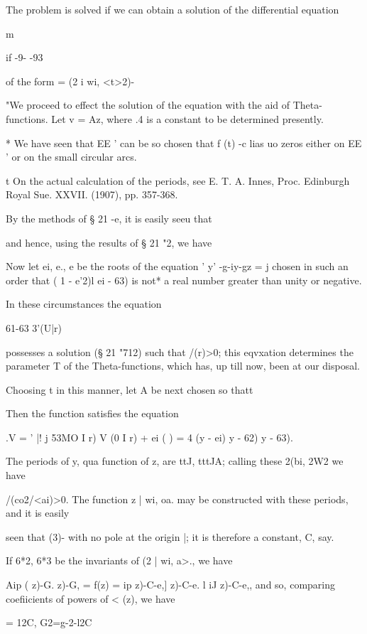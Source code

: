 The problem is solved if we can obtain a solution of the differential
equation

m

   if -9- -93

of the form = (2 i wi, <t>2)-

"We proceed to effect the solution of the equation with the aid of
Theta-functions. Let v = Az, where .4 is a constant to be determined
presently.

* We have seen that EE ' can be so chosen that f (t) -c lias uo zeros
either on EE ' or on the small circular arcs.

t On the actual calculation of the periods, see E. T. A. Innes, Proc.
Edinburgh Royal Sue. XXVII. (1907), pp. 357-368.

%
%

By the methods of § 21 -e, it is easily seeu that

and hence, using the results of § 21 "2, we have

Now let ei, e., e be the roots of the equation ' y' -g-iy-gz = j
chosen in such an order that ( 1 - e'2)l ei - 63) is not* a real
number greater than unity or negative.

In these circumstances the equation

61-63 3'(U|r)

possesses a solution (§ 21 "712) such that /(r)>0; this eqvxation
determines the parameter T of the Theta-functions, which has, up till
now, been at our disposal.

Choosing t in this manner, let A be next chosen so thatt

Then the function satisfies the equation

.V = ' |! j 53MO I r) V (0 I r) + ei ( ) = 4 (y - ei) y - 62) y - 63).

The periods of y, qua function of z, are ttJ, tttJA; calling these
2(bi, 2W2 we have

/(co2/<ai)>0. The function z | wi, oa. may be constructed with these
periods, and it is easily

seen that (3)- %
with no pole at the origin |; it is therefore a constant, C, say.

If 6*2, 6*3 be the invariants of (2 | wi, a>., we have

Aip ( z)-G. z)-G, = f(z) = ip z)-C-e,] z)-C-e. l iJ z)-C-e,, and so,
comparing coefiicients of powers of < (z), we have

= 12C, G2=g-2-l2C%

